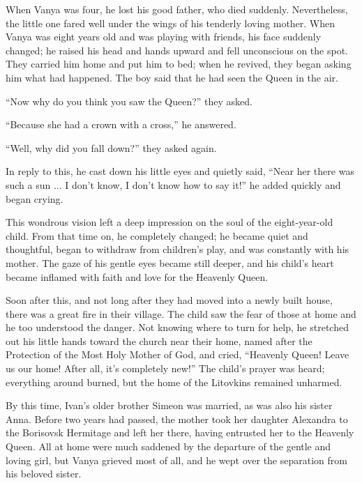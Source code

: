 When Vanya was four, he lost his good father, who died suddenly. Nevertheless, the little one fared well under the wings of his tenderly loving mother. When Vanya was eight years old and was playing with friends, his face suddenly changed; he raised his head and hands upward and fell unconscious on the spot. They carried him home and put him to bed; when he revived, they began asking him what had happened. The boy said that he had seen the Queen in the air.

“Now why do you think you saw the Queen?” they asked.

“Because she had a crown with a cross,” he answered.

“Well, why did you fall down?” they asked again.

In reply to this, he cast down his little eyes and quietly said, “Near her there was such a sun ... I don't know, I don't know how to say it!” he added quickly and began crying.

This wondrous vision left a deep impression on the soul of the eight-year-old child. From that time on, he completely changed; he became quiet and thoughtful, began to withdraw from children's play, and was constantly with his mother. The gaze of his gentle eyes became still deeper, and his child's heart became inflamed with faith and love for the Heavenly Queen.

Soon after this, and not long after they had moved into a newly built house, there was a great fire in their village. The child saw the fear of those at home and he too understood the danger. Not knowing where to turn for help, he stretched out his little hands toward the church near their home, named after the Protection of the Most Holy Mother of God, and cried, “Heavenly Queen! Leave us our home! After all, it's completely new!” The child's prayer was heard; everything around burned, but the home of the Litovkins remained unharmed.

By this time, Ivan's older brother Simeon was married, as was also his sister Anna. Before two years had passed, the mother took her daughter Alexandra to the Borisovsk Hermitage and left her there, having entrusted her to the Heavenly Queen. All at home were much saddened by the departure of the gentle and loving girl, but Vanya grieved most of all, and he wept over the separation from his beloved sister.

